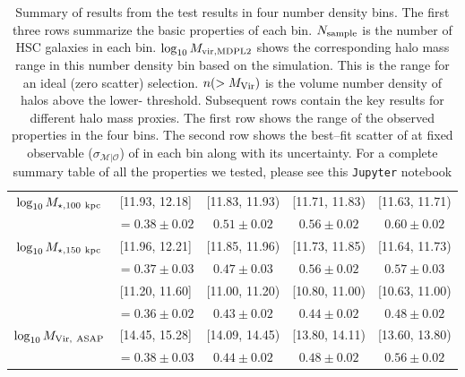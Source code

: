 \begin{table*}
{\begin{tabular}{|c|cccc|}
\multirow{2}{*}{$\log_{10} M_{\star, 100\ \rm kpc}$} & [11.93, 12.18] & [11.83, 11.93) & [11.71, 11.83) & [11.63, 11.71) \\ 
& \sigmvir{}$=0.38\pm0.02$ & $0.51\pm0.02$ & $0.56\pm0.02$ & $0.60\pm0.02$ \\ \hline

\multirow{2}{*}{$\log_{10} M_{\star, 150\ \rm kpc}$} & [11.96, 12.21] & [11.85, 11.96) & [11.73, 11.85) & [11.64, 11.73)  \\ 
& \sigmvir{}$=0.37\pm0.03$ & $0.47\pm0.03$ & $0.56\pm0.02$ & $0.57\pm0.03$ \\ \hhline{|=====|}

\multirow{2}{*}{$\log_{10} M_{\star, [50, 100]}$} & [11.20, 11.60] & [11.00, 11.20) & [10.80, 11.00) & [10.63, 11.00)  \\ 
& \sigmvir{}$=0.36\pm0.02$ & $0.43\pm0.02$ & $0.44\pm0.02$ & $0.48\pm0.02$ \\ \hline

\multirow{2}{*}{$\log_{10} M_{\rm Vir,\ ASAP}$} & [14.45, 15.28] & [14.09, 14.45) & [13.80, 14.11) & [13.60, 13.80)  \\ 
& \sigmvir{}$=0.38\pm0.03$ & $0.44\pm0.02$ & $0.48\pm0.02$ & $0.56\pm0.02$ \\ \hline

\end{tabular}%
}
\caption{
	Summary of results from the \topn{} test results in four number density bins. 
	The first three rows summarize the basic properties of each bin.
	$N_{\rm sample}$ is the number of HSC galaxies in each bin. 
	$\log_{10}M_{\rm vir, MDPL2}$ shows the corresponding halo mass range in this number density bin
	based on the  simulation. 
	This is the \mvir{} range for an ideal (zero scatter) \topn{} selection.
	$n(>M_{\rm Vir})$ is the volume number density of halos above the lower-\mvir{} threshold.
	Subsequent rows contain the key results for different halo mass proxies. 
	The first row shows the range of the observed properties in the four bins.  The second row shows
	the best--fit scatter of \mvir{} at fixed observable ($\sigma_{\mathcal{M}|\mathcal{O}}$) of
	\mvir{} in each bin along with its uncertainty.
	For a complete summary table of all the properties we tested, please see this \texttt{Jupyter} notebook \href{https://github.com/dr-guangtou/jianbing/blob/master/notebooks/topn_result_summary.ipynb}{\faGithub} 
	}
\label{tab:summary}
\end{table*}
